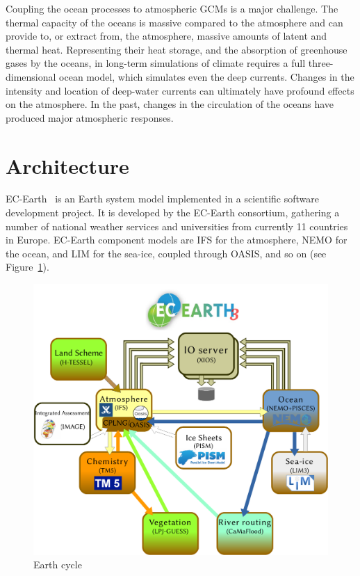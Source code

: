 Coupling the ocean processes to atmospheric GCMs is a major challenge. The thermal capacity of the oceans is massive compared to 
the atmosphere and can provide to, or extract from, the atmosphere, massive amounts of latent and thermal heat. Representing their 
heat storage, and the absorption of greenhouse gases by the oceans, in long-term simulations of climate requires a full three-dimensional 
ocean model, which simulates even the deep currents. Changes in the intensity and location of deep-water currents can ultimately have 
profound effects on the atmosphere. In the past, changes in the circulation of the oceans have produced major atmospheric responses. 





\section{Architecture}
EC-Earth~\cite{Hazeleger2010,Hazeleger2012} is an Earth system model implemented in a scientific software development project. %
It is developed by the EC-Earth consortium, gathering a number of national weather services 
and universities from currently 11 countries in Europe. EC-Earth component models are IFS for the atmosphere, 
NEMO for the ocean, and LIM for the sea-ice, coupled through OASIS, and so on (see Figure~\ref{fig:ecearth}). 



\begin{figure}[h!]
    \centering
    \includegraphics[scale=0.5]{figs/cw2015-ec-earth}
    \caption{Earth cycle}
    \label{fig:ecearth}
\end{figure}

